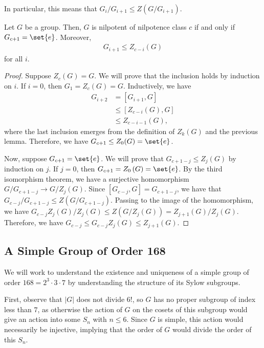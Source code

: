 \documentclass[10pt]{mypackage}
\begin{document}
In particular, this means that $G_i/G_{i+1}\leq Z\left( G/G_{i+1} \right)$.
\begin{theorem}
  Let $G$ be a group. Then, $G$ is nilpotent of nilpotence class $c$ if and only if $G_{c+1} = \set{e}$. Moreover,
  \begin{align*}
    G_{i+1} \leq Z_{c-i} \left( G \right)
  \end{align*}
  for all $i$.
\end{theorem}
\begin{proof}
  Suppose $Z_c(G) = G$. We will prove that the inclusion holds by induction on $i$. If $i = 0$, then $G_1 = Z_c(G) = G$. Inductively, we have
  \begin{align*}
    G_{i+2} &= \left[ G_{i+1},G \right]\\
            &\leq \left[ Z_{c-i}\left( G \right),G \right]\\
            &\leq Z_{c-i-1} \left( G \right),
  \end{align*}
  where the last inclusion emerges from the definition of $Z_k(G)$ and the previous lemma. Therefore, we have $G_{c+1}\leq Z_0(G) = \set{e}$.

  Now, suppose $G_{c+1} = \set{e}$. We will prove that $G_{c+1-j}\leq Z_j\left( G \right)$ by induction on $j$. If $j = 0$, then $G_{c+1} = Z_0\left( G \right) = \set{e}$. By the third isomorphism theorem, we have a surjective homomorphism $G/G_{c+1-j}\rightarrow G/Z_j(G)$. Since $\left[ G_{c-j},G \right] = G_{c+1-j}$, we have that $G_{c-j}/G_{c+1-j} \leq Z\left( G/G_{c+1-j} \right)$. Passing to the image of the homomorphism, we have $G_{c-j}Z_{j}\left( G \right)/Z_j(G) \leq Z\left( G/Z_j(G) \right) = Z_{j+1}(G)/Z_j(G)$. Therefore, we have $G_{c-j} \leq G_{c-j}Z_j(G)\leq Z_{j+1}(G)$.
\end{proof}

\subsection{A Simple Group of Order 168}%
We will work to understand the existence and uniqueness of a simple group of order $168 = 2^3\cdot 3 \cdot 7$ by understanding the structure of its Sylow subgroups.

First, observe that $\left\vert G \right\vert$ does not divide $6!$, so $G$ has no proper subgroup of index less than $7$, as otherwise the action of $G$ on the cosets of this subgroup would give an action into some $S_n$ with $n\leq 6$. Since $G$ is simple, this action would necessarily be injective, implying that the order of $G$ would divide the order of this $S_n$.
\end{document}
